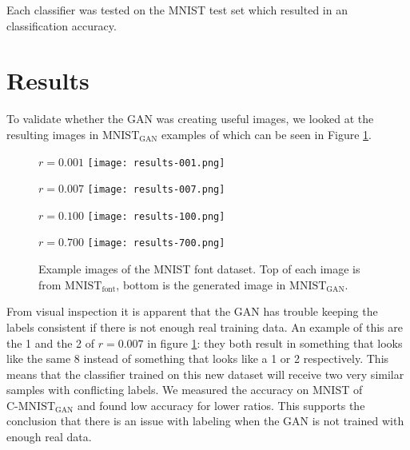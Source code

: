\documentclass[10pt,twocolumn,letterpaper]{article}
\begin{document}
Each classifier was tested on the MNIST test set which resulted in an classification accuracy.

\section{Results}

To validate whether the GAN was creating useful images, we looked at the resulting images in $\text{MNIST}_\text{GAN}$ examples of which can be seen in Figure \ref{fig:results}.

\begin{figure}[h]
\begin{center}
	\parbox{0.7\linewidth}{ \center \small $r = 0.001$ \texttt{[image: results-001.png]} }
	\parbox{0.7\linewidth}{ \center \small $r = 0.007$ \texttt{[image: results-007.png]} }
	\parbox{0.7\linewidth}{ \center \small $r = 0.100$ \texttt{[image: results-100.png]} }
	\parbox{0.7\linewidth}{ \center \small $r = 0.700$ \texttt{[image: results-700.png]} }
\end{center}
   \caption{Example images of the MNIST font dataset. Top of each image is from $\text{MNIST}_\text{font}$, bottom is the generated image in $\text{MNIST}_\text{GAN}$. }
\label{fig:results}
\end{figure}

From visual inspection it is apparent that the GAN has trouble keeping the labels consistent if there is not enough real training data. An example of this are the 1 and the 2 of $r = 0.007$ in figure \ref{fig:results}: they both result in something that looks like the same 8 instead of something that looks like a 1 or 2 respectively. This means that the classifier trained on this new dataset will receive two very similar samples with conflicting labels. We measured the accuracy on MNIST of $\text{C-MNIST}_\text{GAN}$ and found low accuracy for lower ratios. This supports the conclusion that there is an issue with labeling when the GAN is not trained with enough real data.
\end{document}
